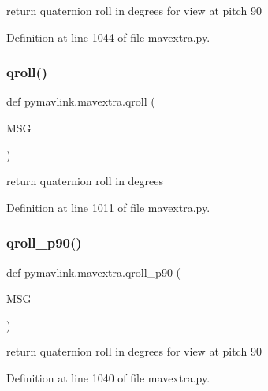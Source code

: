 \begin{DoxyVerb}return quaternion roll in degrees for view at pitch 90\end{DoxyVerb}
 

Definition at line 1044 of file mavextra.\+py.

\mbox{\label{namespacepymavlink_1_1mavextra_af6a04d0089b64397af521e72dfa6f82f}} 
\subsubsection{\texorpdfstring{qroll()}{qroll()}}
{\footnotesize\ttfamily def pymavlink.\+mavextra.\+qroll (\begin{DoxyParamCaption}\item[{}]{M\+SG }\end{DoxyParamCaption})}

\begin{DoxyVerb}return quaternion roll in degrees\end{DoxyVerb}
 

Definition at line 1011 of file mavextra.\+py.

\mbox{\label{namespacepymavlink_1_1mavextra_aaf860983d6c5bb5c19ddc01a98d542dd}} 
\subsubsection{\texorpdfstring{qroll\_p90()}{qroll\_p90()}}
{\footnotesize\ttfamily def pymavlink.\+mavextra.\+qroll\+\_\+p90 (\begin{DoxyParamCaption}\item[{}]{M\+SG }\end{DoxyParamCaption})}

\begin{DoxyVerb}return quaternion roll in degrees for view at pitch 90\end{DoxyVerb}
 

Definition at line 1040 of file mavextra.\+py.

\mbox{\label{namespacepymavlink_1_1mavextra_a60cc24d55dd20230db0faa61038e6cf7}} 
